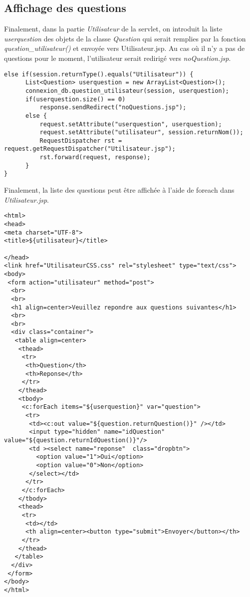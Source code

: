 \documentclass[12]{article}
\begin{document}
\subsection{Affichage des questions}

Finalement, dans la partie \emph{Utilisateur} de la servlet, on introduit la liste \textit{userquestion} des objets de la classe \textit{Question} qui serait remplies par la fonction \textit{question\_utilisateur()} et envoyée vers Utilisateur.jsp. Au cas où il n'y a pas de questions pour le moment, l'utilisateur serait redirigé vers \textit{noQuestion.jsp}.


\begin{small}
\lstset{language=java}
\begin{lstlisting}
else if(session.returnType().equals("Utilisateur")) {
	  List<Question> userquestion = new ArrayList<Question>();
	  connexion_db.question_utilisateur(session, userquestion);
	  if(userquestion.size() == 0)
		  response.sendRedirect("noQuestions.jsp");
	  else {
		  request.setAttribute("userquestion", userquestion);
		  request.setAttribute("utilisateur", session.returnNom());
		  RequestDispatcher rst = request.getRequestDispatcher("Utilisateur.jsp");
		  rst.forward(request, response);
	  }
}
\end{lstlisting}

\end{small}


Finalement, la liste des questions peut être affichée à l'aide de foreach dans \textit{Utilisateur.jsp}.\\

\begin{small}
\lstset{language=XML}
\begin{lstlisting}
<html>
<head>
<meta charset="UTF-8">
<title>${utilisateur}</title>

</head>
<link href="UtilisateurCSS.css" rel="stylesheet" type="text/css">
<body>
 <form action="utilisateur" method="post">
  <br>
  <br>
  <h1 align=center>Veuillez repondre aux questions suivantes</h1>
  <br>
  <br>
  <div class="container">
   <table align=center>
    <thead>
     <tr>
      <th>Question</th>
      <th>Reponse</th>
     </tr>
    </thead>
    <tbody>
     <c:forEach items="${userquestion}" var="question">
      <tr>
       <td><c:out value="${question.returnQuestion()}" /></td>
       <input type="hidden" name="idQuestion" value="${question.returnIdQuestion()}"/>
       <td ><select name="reponse"  class="dropbtn">
         <option value="1">Oui</option>
	     <option value="0">Non</option>
	   </select></td>
	  </tr>
	 </c:forEach>
    </tbody>
    <thead>
     <tr>
      <td></td>
      <th align=center><button type="submit">Envoyer</button></th>
     </tr>
    </thead>
   </table>
  </div>
 </form>
</body>
</html>
\end{lstlisting}

\end{small}
\end{document}
